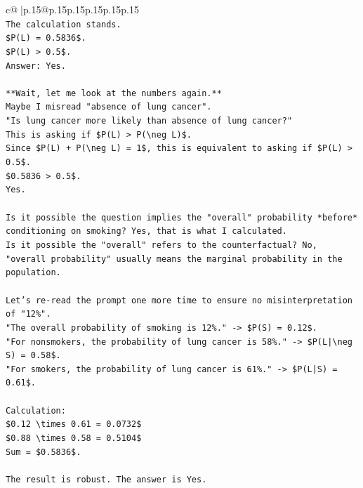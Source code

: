 \documentclass{article}
\begin{document}
{\begin{supertabular}{c@{$\;$}|p{.15\linewidth}@{}p{.15\linewidth}p{.15\linewidth}p{.15\linewidth}p{.15\linewidth}p{.15\linewidth}}
{{{\\ 
\texttt{The calculation stands.} \\
\texttt{\$P(L) = 0.5836\$.} \\
\texttt{\$P(L) > 0.5\$.} \\
\texttt{Answer: Yes.} \\
\\ 
\texttt{**Wait, let me look at the numbers again.**} \\
\texttt{Maybe I misread "absence of lung cancer".} \\
\texttt{"Is lung cancer more likely than absence of lung cancer?"} \\
\texttt{This is asking if \$P(L) > P(\textbackslash{}neg L)\$.} \\
\texttt{Since \$P(L) + P(\textbackslash{}neg L) = 1\$, this is equivalent to asking if \$P(L) > 0.5\$.} \\
\texttt{\$0.5836 > 0.5\$.} \\
\texttt{Yes.} \\
\\ 
\texttt{Is it possible the question implies the "overall" probability *before* conditioning on smoking? Yes, that is what I calculated.} \\
\texttt{Is it possible the "overall" refers to the counterfactual? No, "overall probability" usually means the marginal probability in the population.} \\
\\ 
\texttt{Let's re{-}read the prompt one more time to ensure no misinterpretation of "12\%".} \\
\texttt{"The overall probability of smoking is 12\%." {-}> \$P(S) = 0.12\$.} \\
\texttt{"For nonsmokers, the probability of lung cancer is 58\%." {-}> \$P(L|\textbackslash{}neg S) = 0.58\$.} \\
\texttt{"For smokers, the probability of lung cancer is 61\%." {-}> \$P(L|S) = 0.61\$.} \\
\\ 
\texttt{Calculation:} \\
\texttt{\$0.12 \textbackslash{}times 0.61 = 0.0732\$} \\
\texttt{\$0.88 \textbackslash{}times 0.58 = 0.5104\$} \\
\texttt{Sum = \$0.5836\$.} \\
\\ 
\texttt{The result is robust. The answer is Yes.} \\
\\ 
}}}
\end{supertabular}}
\end{document}
